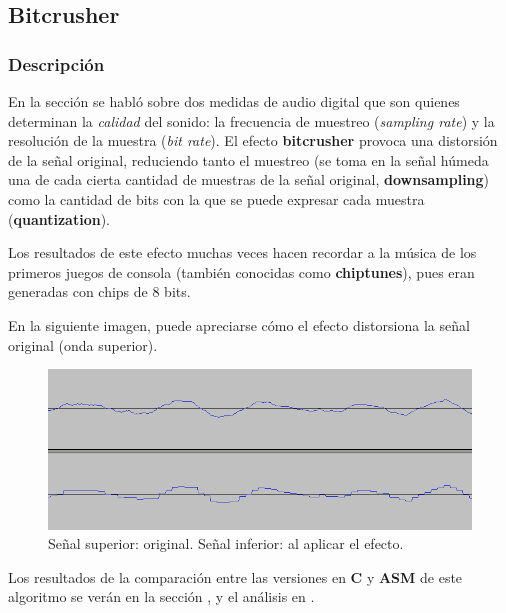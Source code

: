 \subsection{Bitcrusher}
\label{subsec:desarrollo-bitcrusher}

\subsubsection{Descripción}
\label{subsec:desarrollo-bitcrusher-desc}
En la sección  se habló sobre dos medidas de audio digital que son quienes determinan la \textit{calidad} del sonido: la frecuencia de muestreo (\textit{sampling rate}) y la resolución de la muestra (\textit{bit rate}). El efecto \textbf{bitcrusher} provoca una distorsión de la señal original, reduciendo tanto el muestreo (se toma en la señal húmeda una de cada cierta cantidad de muestras de la señal original, \textbf{downsampling}) como la cantidad de bits con la que se puede expresar cada muestra (\textbf{quantization}).

Los resultados de este efecto muchas veces hacen recordar a la música de los primeros juegos de consola (también conocidas como \textbf{chiptunes}), pues eran generadas con chips de 8 bits.

En la siguiente imagen, puede apreciarse cómo el efecto distorsiona la señal original (onda superior).

\begin{figure}[H]
    \centering
    \includegraphics[scale=0.6]{imagenes/bitcrusher-signal.png}
    \caption{Señal superior: original. Señal inferior: al aplicar el efecto.}
    \label{fig:bitcrusher-signals}
\end{figure}


\vspace{\baselineskip}

Los resultados de la comparación entre las versiones en \textbf{C} y \textbf{ASM} de este algoritmo se verán en la sección , y el análisis en .

